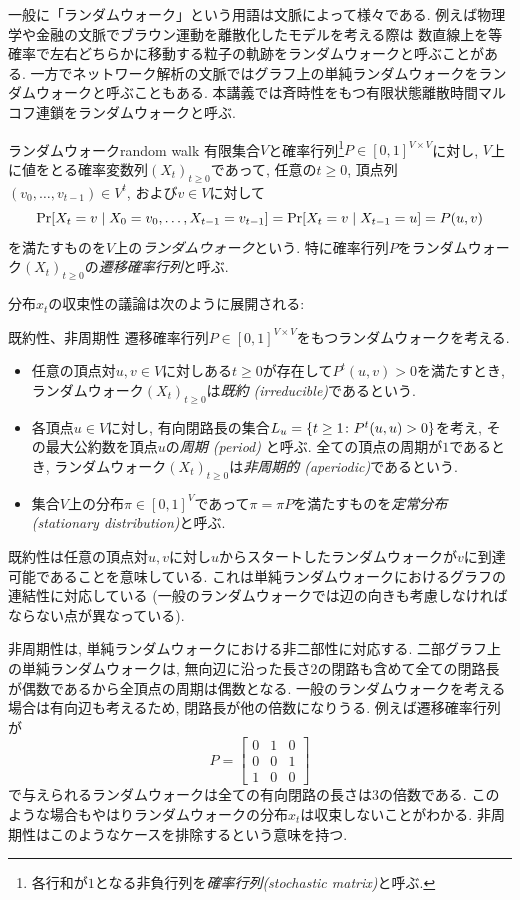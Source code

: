   一般に「ランダムウォーク」という用語は文脈によって様々である.
  例えば物理学や金融の文脈でブラウン運動を離散化したモデルを考える際は
    数直線上を等確率で左右どちらかに移動する粒子の軌跡をランダムウォークと呼ぶことがある.
  一方でネットワーク解析の文脈ではグラフ上の単純ランダムウォークをランダムウォークと呼ぶこともある.
  本講義では斉時性をもつ有限状態離散時間マルコフ連鎖をランダムウォークと呼ぶ.
  \begin{definition}{ランダムウォーク}{random walk}
    有限集合$V$と確率行列\footnote{各行和が$1$となる非負行列を\emph{確率行列(stochastic matrix)}と呼ぶ.}$P\in[0,1]^{V\times V}$に対し,
    $V$上に値をとる確率変数列$(X_t)_{t\ge 0}$であって, 任意の$t\ge 0$, 頂点列$(v_0,\dots,v_{t-1})\in V^t$,
    および$v\in V$に対して
    \[
      \Pr\sbra*{X_t = v \condition X_0 = v_0,\dots,X_{t-1} = v_{t-1}} = \Pr\sbra*{X_t = v \condition X_{t-1} = u} = P(u,v)
    \]
    を満たすものを$V$上の\emph{ランダムウォーク}という.
    特に確率行列$P$をランダムウォーク$(X_t)_{t\ge 0}$の\emph{遷移確率行列}と呼ぶ.
  \end{definition}
  分布$x_t$の収束性の議論は次のように展開される:
  \begin{definition}{既約性、非周期性}{}
    遷移確率行列$P \in [0,1]^{V\times V}$をもつランダムウォークを考える.
    \begin{itemize}
    \item 任意の頂点対$u,v\in V$に対しある$t \ge 0$が存在して$P^t(u,v)>0$を満たすとき, ランダムウォーク$(X_t)_{t\ge 0}$は\emph{既約 (irreducible)}であるという.
    \item 各頂点$u\in V$に対し, 有向閉路長の集合$L_u = \cbra*{ t \ge 1 \colon P^t(u,u) > 0}$を考え, その最大公約数を頂点$u$の\emph{周期 (period)} と呼ぶ. 全ての頂点の周期が$1$であるとき, ランダムウォーク$(X_t)_{t\ge 0}$は\emph{非周期的 (aperiodic)}であるという.
    \item 集合$V$上の分布$\pi\in[0,1]^V$であって$\pi = \pi P$を満たすものを\emph{定常分布 (stationary distribution)}と呼ぶ.
    \end{itemize}
  \end{definition}
%
  既約性は任意の頂点対$u,v$に対し$u$からスタートしたランダムウォークが$v$に到達可能であることを意味している.
  これは単純ランダムウォークにおけるグラフの連結性に対応している
    (一般のランダムウォークでは辺の向きも考慮しなければならない点が異なっている).

  非周期性は, 単純ランダムウォークにおける非二部性に対応する.
  二部グラフ上の単純ランダムウォークは, 無向辺に沿った長さ$2$の閉路も含めて全ての閉路長が偶数であるから全頂点の周期は偶数となる.
  一般のランダムウォークを考える場合は有向辺も考えるため, 閉路長が他の倍数になりうる.
  例えば遷移確率行列が
  \[
    P = \begin{bmatrix}
      0 & 1 & 0 \\
      0 & 0 & 1 \\
      1 & 0 & 0
    \end{bmatrix}
  \]
  で与えられるランダムウォークは全ての有向閉路の長さは$3$の倍数である.
  このような場合もやはりランダムウォークの分布$x_t$は収束しないことがわかる.
  非周期性はこのようなケースを排除するという意味を持つ.

